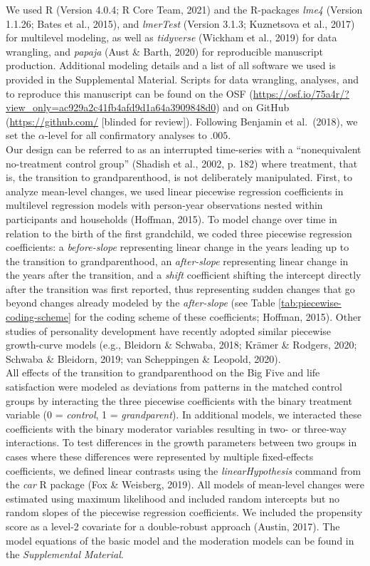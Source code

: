 \documentclass[
  english,
  man, noextraspace]{apa7}
\begin{document}
We used R (Version 4.0.4; R Core Team, 2021) and the R-packages \emph{lme4} (Version 1.1.26; Bates et al., 2015), and \emph{lmerTest} (Version 3.1.3; Kuznetsova et al., 2017) for multilevel modeling, as well as \emph{tidyverse} (Wickham et al., 2019) for data wrangling, and \emph{papaja} (Aust \& Barth, 2020) for reproducible manuscript production. Additional modeling details and a list of all software we used is provided in the Supplemental Material. Scripts for data wrangling, analyses, and to reproduce this manuscript can be found on the OSF (\url{https://osf.io/75a4r/?view_only=ac929a2c41fb4afd9d1a64a3909848d0}) and on GitHub (\url{https://github.com/} {[}blinded for review{]}). Following Benjamin et al.~(2018), we set the \(\alpha\)-level for all confirmatory analyses to \(.005\).\\
Our design can be referred to as an interrupted time-series with a \enquote{nonequivalent no-treatment control group} (Shadish et al., 2002, p. 182) where treatment, that is, the transition to grandparenthood, is not deliberately manipulated. First, to analyze mean-level changes, we used linear piecewise regression coefficients in multilevel regression models with person-year observations nested within participants and households (Hoffman, 2015). To model change over time in relation to the birth of the first grandchild, we coded three piecewise regression coefficients: a \emph{before-slope} representing linear change in the years leading up to the transition to grandparenthood, an \emph{after-slope} representing linear change in the years after the transition, and a \emph{shift} coefficient shifting the intercept directly after the transition was first reported, thus representing sudden changes that go beyond changes already modeled by the \emph{after-slope} (see Table \ref{tab:piecewise-coding-scheme} for the coding scheme of these coefficients; Hoffman, 2015). Other studies of personality development have recently adopted similar piecewise growth-curve models (e.g., Bleidorn \& Schwaba, 2018; Krämer \& Rodgers, 2020; Schwaba \& Bleidorn, 2019; van Scheppingen \& Leopold, 2020).\\
All effects of the transition to grandparenthood on the Big Five and life satisfaction were modeled as deviations from patterns in the matched control groups by interacting the three piecewise coefficients with the binary treatment variable (0 = \emph{control}, 1 = \emph{grandparent}). In additional models, we interacted these coefficients with the binary moderator variables resulting in two- or three-way interactions. To test differences in the growth parameters between two groups in cases where these differences were represented by multiple fixed-effects coefficients, we defined linear contrasts using the \emph{linearHypothesis} command from the \emph{car} R package (Fox \& Weisberg, 2019). All models of mean-level changes were estimated using maximum likelihood and included random intercepts but no random slopes of the piecewise regression coefficients. We included the propensity score as a level-2 covariate for a double-robust approach (Austin, 2017). The model equations of the basic model and the moderation models can be found in the \emph{Supplemental Material}.\\
\end{document}
